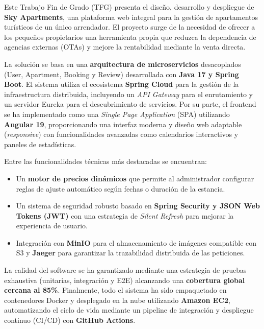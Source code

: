 Este Trabajo Fin de Grado (TFG) presenta el diseño, desarrollo y despliegue de \textbf{Sky Apartments}, una plataforma web integral para la gestión de apartamentos turísticos de un único arrendador. El proyecto surge de la necesidad de ofrecer a los pequeños propietarios una herramienta propia que reduzca la dependencia de agencias externas (OTAs) y mejore la rentabilidad mediante la venta directa.

La solución se basa en una \textbf{arquitectura de microservicios} desacoplados (User, Apartment, Booking y Review) desarrollada con \textbf{Java 17 y Spring Boot}. El sistema utiliza el ecosistema \textbf{Spring Cloud} para la gestión de la infraestructura distribuida, incluyendo un \textit{API Gateway} para el enrutamiento y un servidor Eureka para el descubrimiento de servicios. Por su parte, el frontend se ha implementado como una \textit{Single Page Application} (SPA) utilizando \textbf{Angular 19}, proporcionando una interfaz moderna y diseño web adaptable (\textit{responsive}) con funcionalidades avanzadas como calendarios interactivos y paneles de estadísticas.

Entre las funcionalidades técnicas más destacadas se encuentran:
\begin{itemize}
    \item Un \textbf{motor de precios dinámicos} que permite al administrador configurar reglas de ajuste automático según fechas o duración de la estancia.
    \item Un sistema de seguridad robusto basado en \textbf{Spring Security y JSON Web Tokens (JWT)} con una estrategia de \textit{Silent Refresh} para mejorar la experiencia de usuario.
    \item Integración con \textbf{MinIO} para el almacenamiento de imágenes compatible con S3 y \textbf{Jaeger} para garantizar la trazabilidad distribuida de las peticiones.
\end{itemize}
La calidad del software se ha garantizado mediante una estrategia de pruebas exhaustiva (unitarias, integración y E2E) alcanzando una \textbf{cobertura global cercana al 85\%}. Finalmente, todo el sistema ha sido empaquetado en contenedores Docker y desplegado en la nube utilizando \textbf{Amazon EC2}, automatizando el ciclo de vida mediante un pipeline de integración y despliegue continuo (CI/CD) con \textbf{GitHub Actions}.